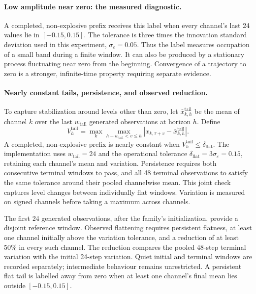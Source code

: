 \paragraph{Low amplitude near zero: the measured diagnostic.}
A completed, non-explosive prefix receives this label when every channel's
last 24 values lie in $[-0.15,0.15]$. The tolerance is three times the
innovation standard deviation used in this experiment, $\sigma_\varepsilon=0.05$.
Thus the label measures occupation of a small band during a finite window.
It can also be produced by a stationary process fluctuating near zero from
the beginning. Convergence of a trajectory to zero is a stronger,
infinite-time property requiring separate evidence.

\paragraph{Nearly constant tails, persistence, and observed reduction.}
To capture stabilization around levels other than zero, let
$\bar x^{\mathrm{tail}}_{k,h}$ be the mean of channel $k$ over the last
$w_{\mathrm{tail}}$ generated observations at horizon $h$. Define
\begin{equation}
 V_h^{\mathrm{tail}}=
 \max_k\max_{h-w_{\mathrm{tail}}<v\leq h}
 \left|x_{k,\tau+v}-\bar x^{\mathrm{tail}}_{k,h}\right|.
 \label{eq:generator-flat-tail}
\end{equation}
A completed, non-explosive prefix is nearly constant when
$V_h^{\mathrm{tail}}\leq\delta_{\mathrm{flat}}$. The implementation uses
$w_{\mathrm{tail}}=24$ and the operational tolerance
$\delta_{\mathrm{flat}}=3\sigma_\varepsilon=0.15$, retaining each channel's
mean and variation. Persistence requires both consecutive terminal windows
to pass, and all 48 terminal observations to satisfy the same tolerance
around their pooled channelwise mean. This joint check captures level changes
between individually flat windows. Variation is measured on signed channels
before taking a maximum across channels.

The first 24 generated observations, after the family's initialization,
provide a disjoint reference window. Observed flattening requires persistent
flatness, at least one channel initially above the variation tolerance, and
a reduction of at least 50\% in every such channel. The reduction compares
the pooled 48-step terminal variation with the initial 24-step variation.
Quiet initial and terminal windows are recorded separately; intermediate
behaviour remains unrestricted. A persistent flat tail is labelled away
from zero when at least one channel's final mean lies outside $[-0.15,0.15]$.

